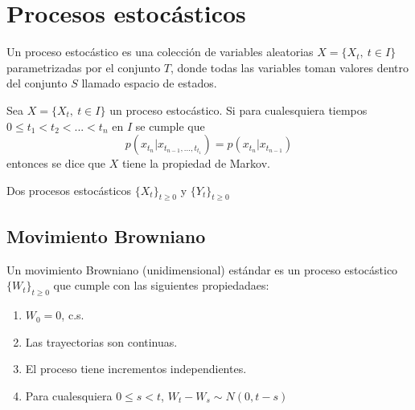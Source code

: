 \section{Procesos estocásticos}

\cite{rinconIntroduccionProcesosEstocasticos2012}

\begin{definition}\label{def:proceso_estocastico}
    Un proceso estocástico es una colección de variables
    aleatorias $X = \{X_t,\ t\in I\}$ parametrizadas por el
    conjunto $T$, donde todas las variables toman valores
    dentro del conjunto $S$ llamado espacio de estados. 
\end{definition}



\begin{definition}
    Sea $X = \{X_t,\ t\in I\}$ un proceso estocástico. Si 
    para cualesquiera tiempos $0\leq t_1<t_2<...<t_n$
    en $I$ se cumple que 
    $$p(x_{t_n}|x_{t_{n-1},...,t_{t_1}})=p(x_{t_n}|x_{t_{n-1}})$$
    entonces se dice que $X$ tiene la propiedad de Markov.
\end{definition}

\begin{definition}
    Dos procesos estocásticos $\{X_t\}_{t\geq 0}$ y 
    $\{Y_t\}_{t\geq 0}$
\end{definition}

\subsection{Movimiento Browniano}

\begin{definition}
    Un movimiento Browniano (unidimensional) estándar es un proceso 
    estocástico $\{W_t\}_{t\geq0}$ que cumple con las siguientes 
    propiedadaes:
    \begin{enumerate}
        \item $W_0=0$, c.s.
        \item Las trayectorias son continuas.
        \item El proceso tiene incrementos independientes. 
        \item Para cualesquiera $0\leq s<t$, $W_t-W_s\sim N(0,t-s)$
    \end{enumerate}
\end{definition}

